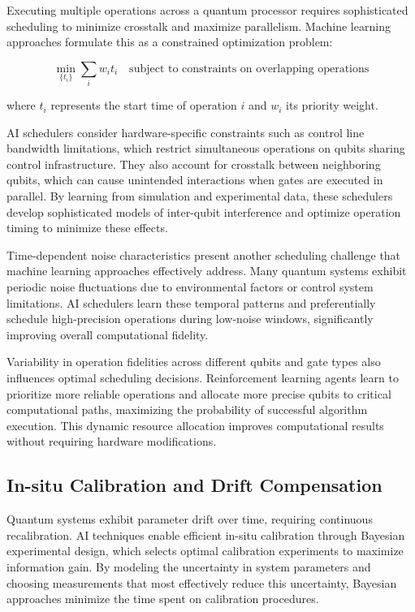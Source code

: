 Executing multiple operations across a quantum processor requires sophisticated scheduling to minimize crosstalk and maximize parallelism. Machine learning approaches formulate this as a constrained optimization problem:

\begin{equation}
\min_{\{t_i\}} \sum_i w_i t_i \quad \text{subject to constraints on overlapping operations}
\end{equation}

where $t_i$ represents the start time of operation $i$ and $w_i$ its priority weight.

AI schedulers consider hardware-specific constraints such as control line bandwidth limitations, which restrict simultaneous operations on qubits sharing control infrastructure. They also account for crosstalk between neighboring qubits, which can cause unintended interactions when gates are executed in parallel. By learning from simulation and experimental data, these schedulers develop sophisticated models of inter-qubit interference and optimize operation timing to minimize these effects.

Time-dependent noise characteristics present another scheduling challenge that machine learning approaches effectively address. Many quantum systems exhibit periodic noise fluctuations due to environmental factors or control system limitations. AI schedulers learn these temporal patterns and preferentially schedule high-precision operations during low-noise windows, significantly improving overall computational fidelity.

Variability in operation fidelities across different qubits and gate types also influences optimal scheduling decisions. Reinforcement learning agents learn to prioritize more reliable operations and allocate more precise qubits to critical computational paths, maximizing the probability of successful algorithm execution. This dynamic resource allocation improves computational results without requiring hardware modifications.

\subsection{In-situ Calibration and Drift Compensation}

Quantum systems exhibit parameter drift over time, requiring continuous recalibration. AI techniques enable efficient in-situ calibration through Bayesian experimental design, which selects optimal calibration experiments to maximize information gain. By modeling the uncertainty in system parameters and choosing measurements that most effectively reduce this uncertainty, Bayesian approaches minimize the time spent on calibration procedures.

